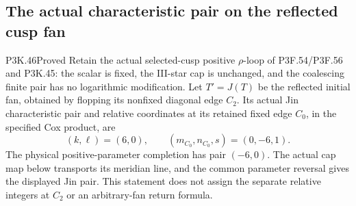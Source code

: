 \subsection{The actual characteristic pair on the reflected cusp fan}
\begin{statement}{P3K.46}{Proved}
Retain the actual selected-cusp positive \(\rho\)-loop of
P3F.54/P3F.56 and P3K.45: the scalar is fixed, the III-star cap
is unchanged, and the coalescing finite pair has no logarithmic
modification. Let \(T'=J(T)\) be the reflected initial fan, obtained
by flopping its nonfixed diagonal edge \(C_2\). Its actual Jin
characteristic pair and relative coordinates at its retained fixed
edge \(C_0\), in the specified Cox product, are
\[
 (k,\ell)=(6,0),\qquad
 (m_{C_0},n_{C_0},s)=(0,-6,1).
\]
The physical positive-parameter completion has pair \((-6,0)\).
The actual cap map below transports its meridian line, and the common
parameter reversal gives the displayed Jin pair. This statement
does not assign the separate relative integers at \(C_2\) or an
arbitrary-fan return formula.
\end{statement}
